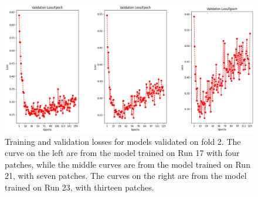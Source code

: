 \begin{figure}[!ht]
	\centering
	\includegraphics[width=1.0\linewidth]{figures/ValidationLossesFourSevenThirteenPatches.png}
	\caption{Training and validation losses for models validated on fold 2. The curve on the left are from the model trained on Run 17 with four patches, while the middle curves are from the model trained on Run 21, with seven patches. The curves on the right are from the model trained on Run 23, with thirteen patches.}
	\label{fig:ValidationLossesFourSevenThirteenPatches}
\end{figure}

